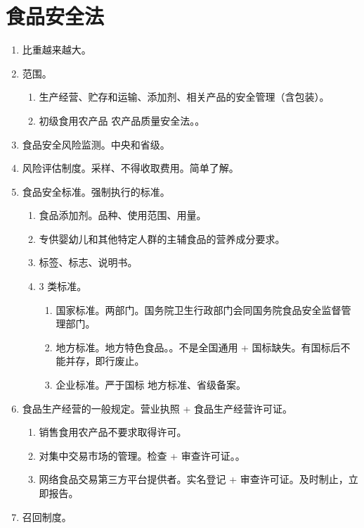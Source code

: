 \section{食品安全法}
\begin{enumerate}
  \item 比重越来越大。
  \item 范围。
        \begin{enumerate}
          \item 生产经营、贮存和运输、添加剂、相关产品的安全管理（含包装）。
          \item 初级食用农产品 \yjt 农产品质量安全法。。
        \end{enumerate}
  \item 食品安全风险监测。中央和省级。
  \item 风险评估制度。采样、不得收取费用。\sjt 简单了解。
  \item 食品安全标准。强制执行的标准。
        \begin{enumerate}
          \item 食品添加剂。品种、使用范围、用量。
          \item 专供婴幼儿和其他特定人群的主辅食品的营养成分要求。
          \item 标签、标志、说明书。
          \item 3 类标准。
                \begin{enumerate}
                  \item 国家标准。两部门。国务院卫生行政部门会同国务院食品安全监督管理部门。
                  \item 地方标准。地方特色食品。。不是全国通用 + 国标缺失。有国标后不能并存，即行废止。
                  \item 企业标准。严于国标 \hz 地方标准、省级备案。
                \end{enumerate}
        \end{enumerate}
  \item 食品生产经营的一般规定。营业执照 + 食品生产经营许可证。
        \begin{enumerate}
          \item 销售食用农产品不要求取得许可。
          \item 对集中交易市场的管理。检查 + 审查许可证。。
          \item 网络食品交易第三方平台提供者。实名登记 + 审查许可证。\sjt 及时制止，立即报告。
        \end{enumerate}
  \item 召回制度。

\end{enumerate}
